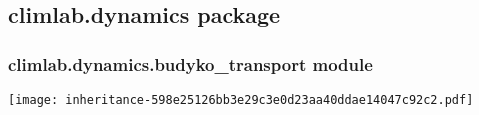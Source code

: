 \documentclass[a4paper,10pt,english]{sphinxmanual}
\begin{document}
\subsection{climlab.dynamics package}
\label{api/climlab.dynamics:climlab-dynamics-package}\label{api/climlab.dynamics::doc}

\subsubsection{climlab.dynamics.budyko\_transport module}
\label{api/climlab.dynamics:climlab-dynamics-budyko-transport-module}
\texttt{[image: inheritance-598e25126bb3e29c3e0d23aa40ddae14047c92c2.pdf]}
\label{api/climlab.dynamics:module-climlab.dynamics.budyko_transport}
\end{document}
